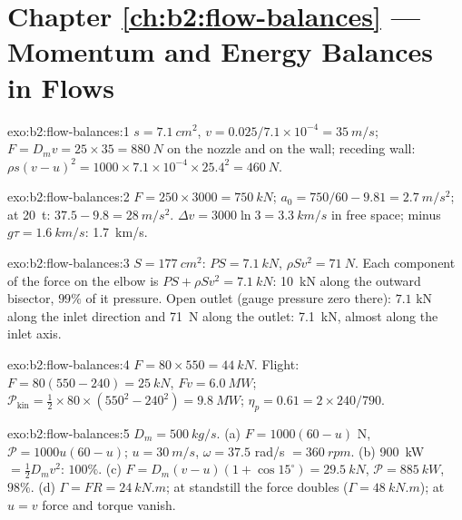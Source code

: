 \section*{Chapter \ref{ch:b2:flow-balances} --- Momentum and Energy Balances in Flows}

\begin{solution}{exo:b2:flow-balances:1}
$s = \qty{7.1}{cm^2}$, $v = 0.025/7.1 \times 10^{-4} = \qty{35}{m/s}$; $F = D_mv = 25
\times 35 = \qty{880}{N}$ on the nozzle and on the wall; receding wall: $\rho s(v -
u)^2 = 1000 \times 7.1 \times 10^{-4} \times 25.4^2 = \qty{460}{N}$.
\end{solution}

\begin{solution}{exo:b2:flow-balances:2}
$F = 250 \times 3000 = \qty{750}{kN}$; $a_0 = 750/60 - 9.81 = \qty{2.7}{m/s^2}$; at
\qty{20}{t}: $37.5 - 9.8 = \qty{28}{m/s^2}$. $\Delta v = 3000\ln3 = \qty{3.3}{km/s}$ in
free space; minus $g\tau = \qty{1.6}{km/s}$: \qty{1.7}{km/s}.
\end{solution}

\begin{solution}{exo:b2:flow-balances:3}
$S = \qty{177}{cm^2}$: $PS = \qty{7.1}{kN}$, $\rho Sv^2 = \qty{71}{N}$. Each component
of the force on the elbow is $PS + \rho Sv^2 = \qty{7.1}{kN}$: \qty{10}{kN} along
the outward bisector, $99\%$ of it pressure. Open outlet (gauge pressure
zero there): $7.1$ kN along the inlet direction and \qty{71}{N} along the
outlet: \qty{7.1}{kN}, almost along the inlet axis.
\end{solution}

\begin{solution}{exo:b2:flow-balances:4}
$F = 80 \times 550 = \qty{44}{kN}$. Flight: $F = 80(550 - 240) = \qty{25}{kN}$, $Fv =
\qty{6.0}{MW}$; $\mathcal P_{\text{kin}} = \tfrac12 \times 80 \times (550^2 - 240^2) =
\qty{9.8}{MW}$; $\eta_p = 0.61 = 2 \times 240/790$.
\end{solution}

\begin{solution}{exo:b2:flow-balances:5}
$D_m = \qty{500}{kg/s}$. (a) $F = 1000(60 - u)$ N, $\mathcal P = 1000u(60 - u)$; $u =
\qty{30}{m/s}$, $\omega = 37.5$ rad/s $= \qty{360}{rpm}$. (b) \qty{900}{kW} $=
\tfrac12D_mv^2$: $100\%$. (c) $F = D_m(v - u)(1 + \cos15^\circ) = \qty{29.5}{kN}$, $\mathcal P
= \qty{885}{kW}$, $98\%$. (d) $\Gamma = FR = \qty{24}{kN.m}$; at standstill the force
doubles ($\Gamma = \qty{48}{kN.m}$); at $u = v$ force and torque vanish.
\end{solution}

